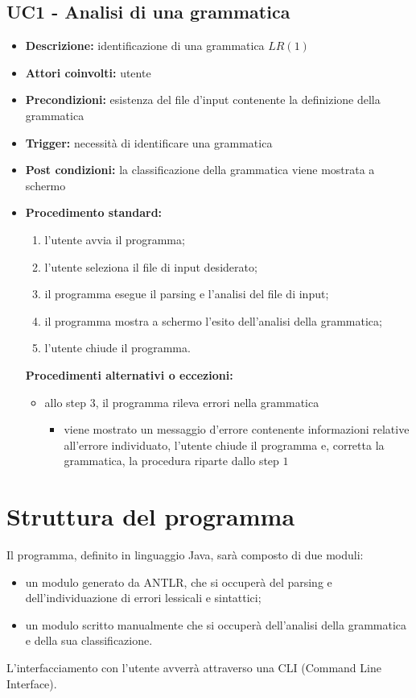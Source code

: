 \documentclass[12pt]{article}
\begin{document}
\subsection{UC1 - Analisi di una grammatica}
\begin{itemize}[label=]
\item \textbf{Descrizione:} identificazione di una grammatica $LR\left( 1 \right)$
\item \textbf{Attori coinvolti:} utente
\item \textbf{Precondizioni:} esistenza del file d'input contenente la definizione della grammatica
\item \textbf{Trigger:} necessità di identificare una grammatica
\item \textbf{Post condizioni:} la classificazione della grammatica viene mostrata a schermo
\item \textbf{Procedimento standard:}
\begin{enumerate}[label=\arabic*.]
\item l'utente avvia il programma;
\item l'utente seleziona il file di input desiderato;
\item il programma esegue il parsing e l'analisi del file di input;
\item il programma mostra a schermo l'esito dell'analisi della grammatica;
\item l'utente chiude il programma.
\end{enumerate}
\textbf{Procedimenti alternativi o eccezioni:}
\begin{itemize}
\item allo step $3$, il programma rileva errori nella grammatica
\begin{itemize}[label=]
\item viene mostrato un messaggio d'errore contenente informazioni relative all'errore individuato, l'utente chiude il programma e, corretta la grammatica, la procedura riparte dallo step $1$
\end{itemize}
\end{itemize}
\end{itemize}
\pagebreak
\section{Struttura del programma}
Il programma, definito in linguaggio Java, sarà composto di due moduli:
\begin{itemize}
\item un modulo generato da ANTLR, che si occuperà del parsing e dell'individuazione di errori lessicali e sintattici;
\item un modulo scritto manualmente che si occuperà dell'analisi della grammatica e della sua classificazione.
\end{itemize}
L'interfacciamento con l'utente avverrà attraverso una CLI (Command Line Interface).
\pagebreak
\end{document}
